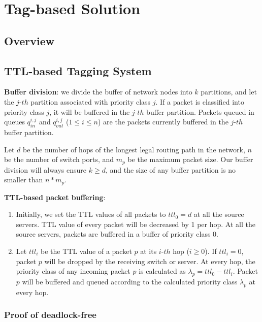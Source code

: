 \section{Tag-based Solution}\label{sec:generic}

\subsection{Overview}


\subsection{TTL-based Tagging System}\label{subsec:ttlscheme}

\textbf{Buffer division}: we divide the buffer of network nodes into $k$ partitions, and let the $j$-$th$ partition associated with priority class $j$. If a packet is classified into priority class $j$, it will  be buffered in the $j$-$th$ buffer partition. Packets queued in queues $q_{in}^{i,j}$ and $q_{out}^{i,j}$ ($1\leq i \leq n$) are the packets currently buffered in the $j$-$th$ buffer partition.

Let $d$ be the number of hops of the longest legal routing path in the network, $n$ be the number of switch ports, and $m_{p}$ be the maximum packet size. Our buffer division will always ensure $k \geq d$, and the size of any buffer partition is no smaller than $n*m_{p}$. 

\textbf{TTL-based packet buffering}: 
\begin{enumerate}
	\item  Initially, we set the TTL values of all packets to $ttl_0=d$ at all the source servers. TTL value of every packet will be decreased by 1 per hop. At all the source servers, packets are buffered in a buffer of priority class $0$.
	
	\item Let $ttl_i$ be the TTL value of a packet $p$ at its $i$-$th$ hop ($i \geq 0$). If $ttl_i = 0$, packet $p$ will be dropped by the receiving switch or server. At every hop, the priority class of any incoming packet $p$ is calculated as $\lambda_p = ttl_0 - ttl_i $. Packet $p$ will be buffered and queued according to the calculated priority class $\lambda_p$ at every hop.
\end{enumerate}
  
\subsubsection{Proof of deadlock-free}

